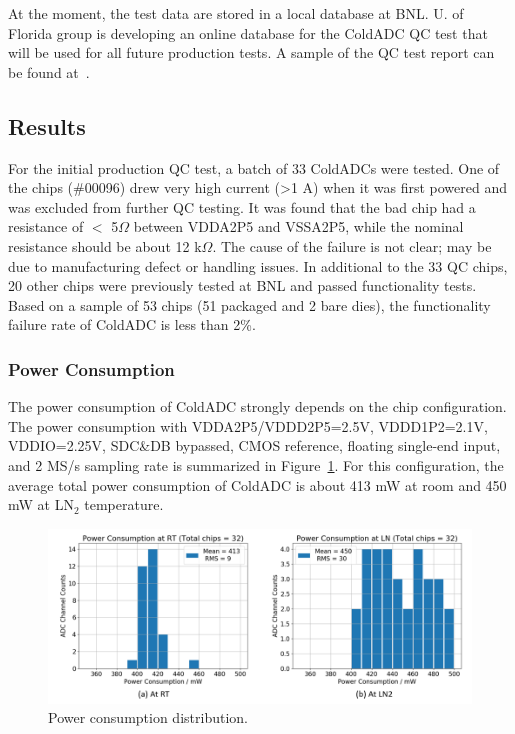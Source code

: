 At the moment, the test data are stored in a local database at BNL. U. of Florida group is developing an online database for the ColdADC QC test that will be used for all future production tests. A sample of the QC test report can be found at~\cite{qcreport}.

\subsection{Results}
\label{sec:6.2}
For the initial production QC test, a batch of 33 ColdADCs were tested. One of the chips (\#00096)  drew very high current (>1 A) when it 
was first powered and was excluded from further QC testing. It was found that the bad chip had a resistance of $<$ 5$\Omega$ between 
VDDA2P5 and VSSA2P5, while the nominal resistance should be about 12 k$\Omega$. The cause of the failure is not clear; may be due to 
manufacturing defect or handling issues. In additional to the 33 QC chips, 20 other chips were previously tested at BNL and passed 
functionality tests. Based on a sample of 53 chips (51 packaged and 2 bare dies), the functionality failure rate of ColdADC is less than 2\%.

\subsubsection{Power Consumption}
The power consumption of ColdADC strongly depends on the chip configuration. The power consumption with VDDA2P5/VDDD2P5=2.5V, 
VDDD1P2=2.1V, VDDIO=2.25V, SDC\&DB bypassed, CMOS reference, floating single-end input, and 2 MS/s sampling rate is summarized in 
Figure~\ref{fig:qc_power}. For this configuration, the average total power consumption of ColdADC is about 413 mW at room and 450 mW at LN$_2$ temperature.
\begin{figure}[h!]
\centering
  \includegraphics[width=0.85\linewidth]{figures/qc_power.png}
  \caption{Power consumption distribution.}
  \label{fig:qc_power}
\end{figure}

